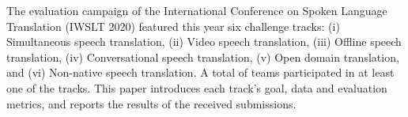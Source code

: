 The evaluation campaign of the International Conference on Spoken Language Translation (IWSLT 2020) featured this year six challenge tracks: (i) Simultaneous speech translation, (ii) Video speech translation, (iii) Offline speech translation, (iv) Conversational speech translation, (v) Open domain translation, and (vi) Non-native speech translation. A total of \numteams{\textasciitilde} teams participated in at least one of the tracks. This paper introduces each  track's goal, data and evaluation metrics, and reports the results of  the received submissions.
